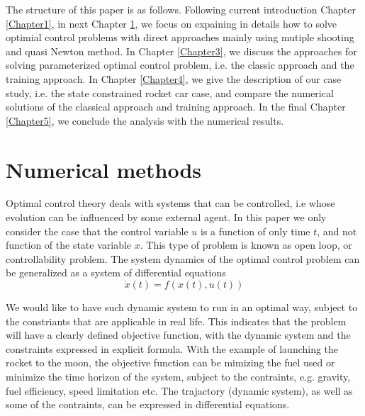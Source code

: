 \documentclass  [
  paper    = a4,
  BCOR     = 10mm,
  twoside,
  fontsize = 12pt,
  fleqn,
  toc      = bibnumbered,
  toc      = listofnumbered,
  numbers  = noendperiod,
  headings = normal,
  listof   = leveldown,
  version  = 3.03
]                                       {scrreprt}
\newcommand{\<}{\langle}
\renewcommand{\>}{\rangle}
\begin{document}
The structure of this paper is as follows. Following current introduction Chapter \ref{Chapter1}, in next Chapter \ref{Chapter2}, we focus on expaining in details how to solve optimial control problems with direct approaches mainly using mutiple shooting and quasi Newton method.  In Chapter \ref{Chapter3}, we discuss the approaches for solving parameterized optimal control problem, i.e. the classic approach and the training approach.  In Chapter \ref{Chapter4}, we give the description of our case study, i.e. the state constrained rocket car case, and compare the numerical solutions of the classical approach and training approach. In the final Chapter \ref{Chapter5}, we conclude the analysis with the numerical results. 




\chapter{Numerical methods}
\label{Chapter2}
Optimal control theory deals with systems that can be controlled, i.e whose evolution can be influenced by some external agent. In this paper we only consider the case that the control variable $u$ is a function of only time $t$, and not function of the state variable $x$. This type of problem is known as open loop, or controllability problem. The system dynamics of the optimal control problem can be generalized as a system of differential equations 
\begin{equation}
	  \dot{x} (t) = f(x(t), u(t))
\end{equation}	  

We would like to have such dynamic system to run in an optimal way, subject to the constriants that are applicable in real life. This indicates that the problem will have a clearly defined objective function, with the dynamic system and the constraints expressed in explicit formula. With the example of launching the rocket to the moon, the objective function can be mimizing the fuel used or minimize the time horizon of the system, subject to the contraints, e.g. gravity, fuel efficiency, speed limitation etc. The trajactory (dynamic system), as well as some of the contraints, can be expressed in differential equations.  
\end{document}

